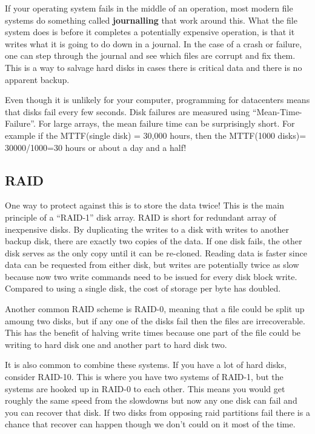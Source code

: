 If your operating system fails in the middle of an operation, most modern file systems do something called \textbf{journalling} that work around this. What the file system does is before it completes a potentially expensive operation, is that it writes what it is going to do down in a journal. In the case of a crash or failure, one can step through the journal and see which files are corrupt and fix them. This is a way to salvage hard disks in cases there is critical data and there is no apparent backup.

Even though it is unlikely for your computer, programming for datacenters means that disks fail every few seconds. Disk failures are measured using ``Mean-Time-Failure''. For large arrays, the mean failure time can be surprisingly short. For example if the MTTF(single disk) = 30,000 hours, then the MTTF(1000 disks)= 30000/1000=30 hours or about a day and a half!

\subsection{RAID}\label{redundancy}

One way to protect against this is to store the data twice! This is the main principle of a ``RAID-1'' disk array. RAID is short for redundant array of inexpensive disks. By duplicating the writes to a disk with writes to another backup disk, there are exactly two copies of the data. If one disk fails, the other disk serves as the only copy until it can be re-cloned. Reading data is faster since data can be requested from either disk, but writes are potentially twice as slow because now two write commands need to be issued for every disk block write. Compared to using a single disk, the cost of storage per byte has doubled.

Another common RAID scheme is RAID-0, meaning that a file could be split up amoung two disks, but if any one of the disks fail then the files are irrecoverable. This has the benefit of halving write times because one part of the file could be writing to hard disk one and another part to hard disk two.

It is also common to combine these systems. If you have a lot of hard disks, consider RAID-10. This is where you have two systems of RAID-1, but the systems are hooked up in RAID-0 to each other. This means you would get roughly the same speed from the slowdowns but now any one disk can fail and you can recover that disk. If two disks from opposing raid partitions fail there is a chance that recover can happen though we don't could on it most of the time.

